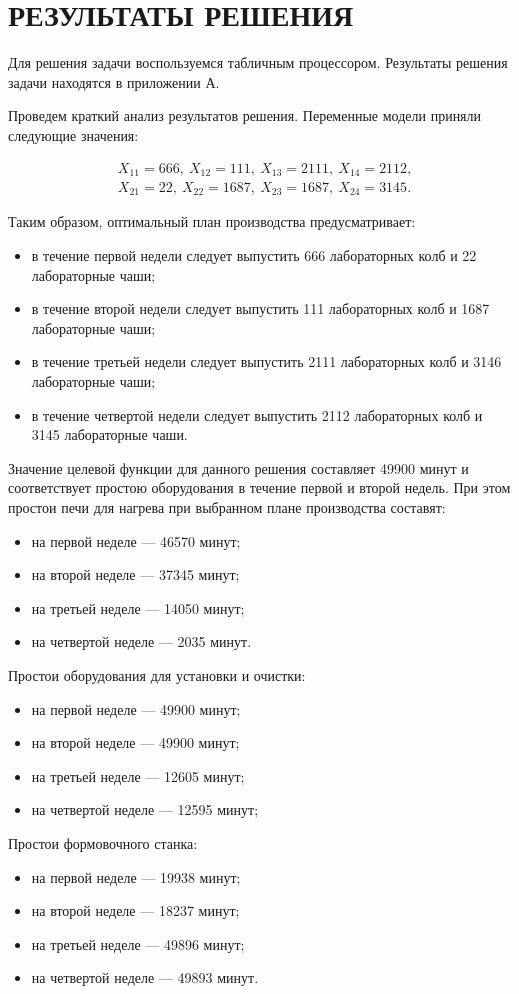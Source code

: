 \section{РЕЗУЛЬТАТЫ РЕШЕНИЯ}

Для решения задачи воспользуемся табличным процессором.
Результаты решения задачи находятся в приложении А.

Проведем краткий анализ результатов решения.
Переменные модели приняли следующие значения:
\begin{small}
  \begin{align*}
    & X_{11} = 666, \: X_{12} = 111,  \: X_{13} = 2111, \: X_{14} = 2112, \\
    & X_{21} = 22,  \: X_{22} = 1687, \: X_{23} = 1687, \: X_{24} = 3145.
  \end{align*}
\end{small}

\vspace{-7mm}

Таким образом, оптимальный план производства предусматривает:
\begin{itemize}
	\item в течение первой недели следует выпустить 
	  666 лабораторных колб и 22 лабораторные чаши;
	\item в течение второй недели следует выпустить 
	  111 лабораторных колб и 1687 лабораторные чаши;
	\item в течение третьей недели следует выпустить 
	  2111 лабораторных колб и 3146 лабораторные чаши;
	\item в течение четвертой недели следует выпустить 
	  2112 лабораторных колб и 3145 лабораторные чаши.
\end{itemize}

Значение целевой функции для данного решения составляет 49900 минут и
соответствует простою оборудования в течение первой и второй недель.
При этом простои печи для нагрева при выбранном плане производства составят:
\begin{itemize}
	\item на первой неделе --- 46570 минут;
	\item на второй неделе --- 37345 минут;
	\item на третьей неделе --- 14050 минут;
	\item на четвертой неделе --- 2035 минут.
\end{itemize}

Простои оборудования для установки и очистки:
\begin{itemize}
	\item на первой неделе --- 49900 минут;
	\item на второй неделе --- 49900 минут;
	\item на третьей неделе --- 12605 минут;
	\item на четвертой неделе --- 12595 минут;
\end{itemize}

Простои формовочного станка:
\begin{itemize}
	\item на первой неделе --- 19938 минут;
	\item на второй неделе --- 18237 минут;
	\item на третьей неделе --- 49896 минут;
	\item на четвертой неделе --- 49893 минут.
\end{itemize}

\newpage